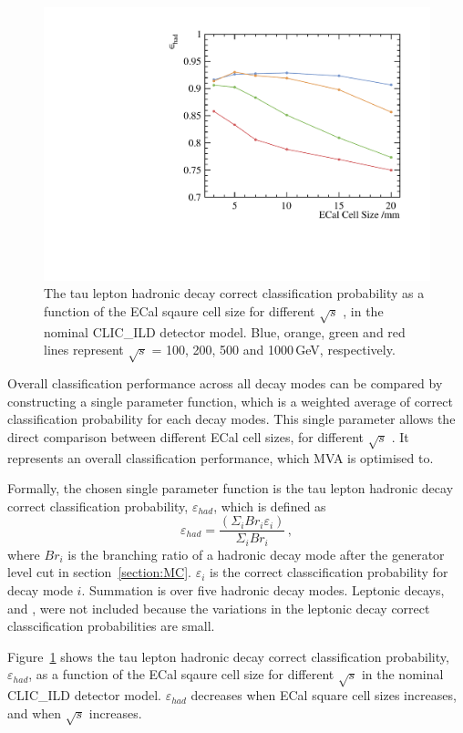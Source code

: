 \documentclass[a4paper,11pt]{article}
\newcommand{\decayElectron}{\Pem\PAGne\PGnGt}
\newcommand{\decayMuon}{\PGmm\PAGnGm\PGnGt}
\newcommand{\rootS}{\ensuremath{\sqrt{s}} }
\begin{document}
\begin{figure}[htbp]
\centering %
\includegraphics[width=.45\textwidth]{plots/hadEff3}
\caption{\label{fig:hadronic_efficiency} The tau lepton hadronic decay correct classification probability as a function of the ECal sqaure cell size for different \rootS,   in the nominal CLIC\_ILD detector model. Blue, orange, green and red lines represent \rootS = 100, 200, 500 and 1000\,GeV, respectively.}
\end{figure}

Overall classification performance across all decay modes can be compared by constructing a single parameter function, which is a weighted average of correct classification probability for each decay modes. This single parameter allows the direct comparison between different ECal cell sizes, for different \rootS. It represents an overall classification performance, which MVA is optimised to.

Formally, the chosen single parameter function is the tau lepton hadronic decay correct classification probability, $\varepsilon_{had}$, which is defined as
\begin{equation}
\label{eq:had}
\varepsilon_{had} = \frac{\left(\Sigma_{i} {Br}_{i}\varepsilon_{i}\right)}{\Sigma_{i} {Br}_{i}}  \,,
\end{equation}
where $Br_{i}$ is the branching ratio of a hadronic decay mode after the generator level cut in section~\ref{section:MC}. $\varepsilon_{i}$ is the correct classcification probability for decay mode $i$. Summation is over five hadronic decay modes. Leptonic decays, \decayElectron and \decayMuon, were not included because the variations in the leptonic decay correct classcification probabilities are small.


Figure~\ref{fig:hadronic_efficiency} shows the tau lepton hadronic decay correct classification probability, $\varepsilon_{had}$, as a function of the ECal sqaure cell size for different \rootS in the nominal CLIC\_ILD detector model. $\varepsilon_{had}$ decreases when ECal square cell sizes increases, and when \rootS increases.
\end{document}
